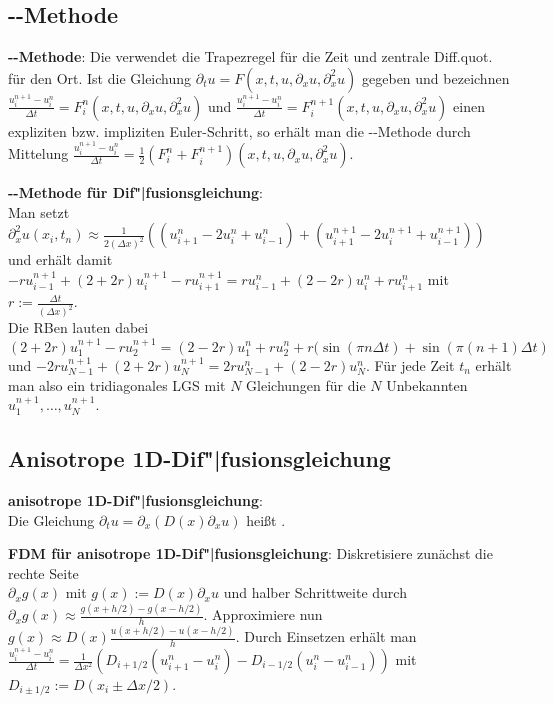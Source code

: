 \pagebreak

\subsection{%
    --Methode%
}

\textbf{--Methode}:
Die  verwendet
die Trapezregel für die Zeit und zentrale Diff.quot. für den Ort.
Ist die Gleichung $\partial_t u = F(x, t, u, \partial_x u, \partial_x^2 u)$ gegeben
und bezeichnen $\frac{u_i^{n+1} - u_i^n}{\Delta t} = F_i^n(x, t, u, \partial_x u, \partial_x^2 u)$
und $\frac{u_i^{n+1} - u_i^n}{\Delta t} = F_i^{n+1}(x, t, u, \partial_x u, \partial_x^2 u)$
einen expliziten bzw. impliziten Euler-Schritt, so erhält man die
--Methode durch Mittelung
$\frac{u_i^{n+1} - u_i^n}{\Delta t} =
\frac{1}{2} (F_i^n + F_i^{n+1})(x, t, u, \partial_x u, \partial_x^2 u)$.

\textbf{--Methode für Dif"|fusionsgleichung}:\\
Man setzt $\partial_x^2 u(x_i, t_n) \approx
\frac{1}{2(\Delta x)^2} ((u_{i+1}^n - 2u_i^n + u_{i-1}^n) +
(u_{i+1}^{n+1} - 2u_i^{n+1} + u_{i-1}^{n+1}))$
und erhält damit\\
$-r u_{i-1}^{n+1} + (2+2r)u_i^{n+1} - ru_{i+1}^{n+1} = ru_{i-1}^n + (2-2r)u_i^n + ru_{i+1}^n$
mit $r := \frac{\Delta t}{(\Delta x)^2}$.\\
Die RBen lauten dabei $(2+2r)u_1^{n+1} - ru_2^{n+1} = (2-2r)u_1^n + ru_2^n +
r(\sin(\pi n \Delta t) + \sin(\pi (n+1) \Delta t)$ und
$-2ru_{N-1}^{n+1} + (2+2r)u_N^{n+1} = 2ru_{N-1}^n + (2-2r)u_N^n$.
Für jede Zeit $t_n$ erhält man also ein tridiagonales LGS mit $N$ Gleichungen für die $N$
Unbekannten $u_1^{n+1}, \dotsc, u_N^{n+1}$.

\subsection{%
    Anisotrope 1D-Dif"|fusionsgleichung%
}

\textbf{anisotrope 1D-Dif"|fusionsgleichung}:\\
Die Gleichung $\partial_t u = \partial_x (D(x) \partial_x u)$
heißt .

\textbf{FDM für anisotrope 1D-Dif"|fusionsgleichung}:
Diskretisiere zunächst die rechte Seite\\
$\partial_x g(x)$ mit $g(x) := D(x) \partial_x u$ und halber Schrittweite
durch $\partial_x g(x) \approx \frac{g(x + h/2) - g(x - h/2)}{h}$.
Approximiere nun $g(x) \approx D(x) \frac{u(x + h/2) - u(x - h/2)}{h}$.
Durch Einsetzen erhält man\\
$\frac{u_i^{n+1} - u_i^n}{\Delta t} =
\frac{1}{\Delta x^2} (D_{i+1/2} (u_{i+1}^n - u_i^n) - D_{i-1/2} (u_i^n - u_{i-1}^n))$
mit $D_{i\pm1/2} := D(x_i \pm \Delta x/2)$.

